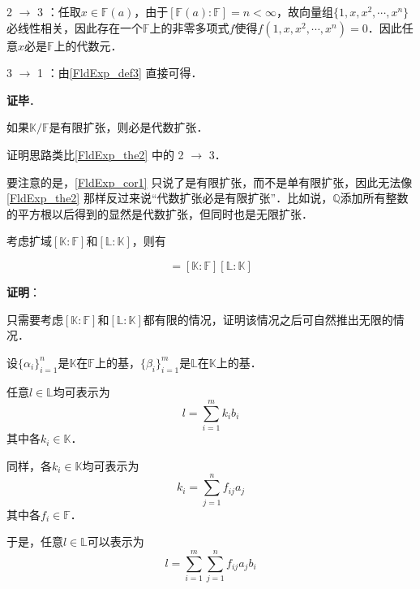 2 $\to$ 3 ：任取$x\in\mathbb{F}(a)$，由于$[\mathbb{F}(a):\mathbb{F}]=n<\infty$，故向量组$\{1, x, x^2, \cdots, x^n\}$必线性相关，因此存在一个$\mathbb{F}$上的非零多项式$f$使得$f(1, x, x^2, \cdots, x^n)=0$．因此任意$x$必是$\mathbb{F}$上的代数元．

3 $\to$ 1 ：由\autoref{FldExp_def3} 直接可得．

\textbf{证毕}．

\begin{corollary}{}\label{FldExp_cor1}
如果$\mathbb{K}/\mathbb{F}$是有限扩张，则必是代数扩张．
\end{corollary}

证明思路类比\autoref{FldExp_the2} 中的 2 $\to$ 3．

要注意的是，\autoref{FldExp_cor1} 只说了是有限扩张，而不是单有限扩张，因此无法像\autoref{FldExp_the2} 那样反过来说“代数扩张必是有限扩张”．比如说，$\mathbb{Q}$添加所有整数的平方根以后得到的显然是代数扩张，但同时也是无限扩张．





\begin{theorem}{}\label{FldExp_the3}
考虑扩域$[\mathbb{K}:\mathbb{F}]$和$[\mathbb{L}:\mathbb{K}]$，则有

\begin{equation}
[\mathbb{L}:\mathbb{F}]=[\mathbb{K}:\mathbb{F}][\mathbb{L}:\mathbb{K}]
\end{equation}

\end{theorem}

\textbf{证明}：

只需要考虑$[\mathbb{K}:\mathbb{F}]$和$[\mathbb{L}:\mathbb{K}]$都有限的情况，证明该情况之后可自然推出无限的情况．

设$\{\alpha_i\}_{i=1}^{n}$是$\mathbb{K}$在$\mathbb{F}$上的基，$\{\beta_i\}_{i=1}^{m}$是$\mathbb{L}$在$\mathbb{K}$上的基．

任意$l\in\mathbb{L}$均可表示为
\begin{equation}
l = \sum_{i=1}^m k_ib_i
\end{equation}
其中各$k_i\in\mathbb{K}$．

同样，各$k_i\in\mathbb{K}$均可表示为
\begin{equation}
k_i = \sum_{j=1}^n f_{ij}a_j
\end{equation}
其中各$f_i\in\mathbb{F}$．

于是，任意$l\in\mathbb{L}$可以表示为
\begin{equation}
l = \sum_{i=1}^m \sum_{j=1}^n f_{ij}a_jb_i
\end{equation}

